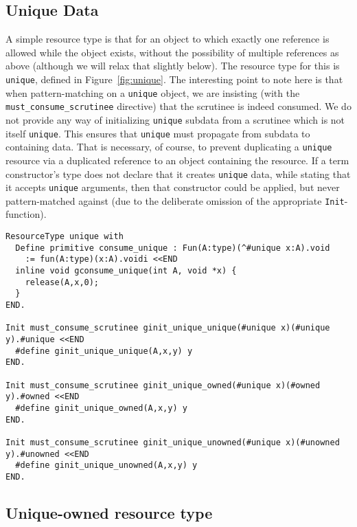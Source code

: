 \documentclass[9pt,natbib]{sigplanconf}
\begin{document}
\subsection{Unique Data}

A simple resource type is that for an object to which exactly one
reference is allowed while the object exists, without the possibility
of multiple references as above (although we will relax that slightly
below).  The resource type for this is \texttt{unique}, defined in
Figure~\ref{fig:unique}.  The interesting point to note here is that
when pattern-matching on a \texttt{unique} object, we are insisting
(with the \texttt{must\_consume\_scrutinee} directive) that the
scrutinee is indeed consumed.  We do not provide any way of
initializing \texttt{unique} subdata from a scrutinee which is not
itself \texttt{unique}.  This ensures that \texttt{unique} must
propagate from subdata to containing data.  That is necessary, of
course, to prevent duplicating a \texttt{unique} resource via a
duplicated reference to an object containing the resource.  If a term
constructor's type does not declare that it creates \texttt{unique}
data, while stating that it accepts \texttt{unique} arguments, then
that constructor could be applied, but never pattern-matched against
(due to the deliberate omission of the appropriate
\texttt{Init}-function).

\begin{figure*}
\small
\begin{verbatim}
ResourceType unique with
  Define primitive consume_unique : Fun(A:type)(^#unique x:A).void
    := fun(A:type)(x:A).voidi <<END
  inline void gconsume_unique(int A, void *x) {
    release(A,x,0);
  }
END.

Init must_consume_scrutinee ginit_unique_unique(#unique x)(#unique y).#unique <<END
  #define ginit_unique_unique(A,x,y) y
END.

Init must_consume_scrutinee ginit_unique_owned(#unique x)(#owned y).#owned <<END
  #define ginit_unique_owned(A,x,y) y
END.

Init must_consume_scrutinee ginit_unique_unowned(#unique x)(#unowned y).#unowned <<END
  #define ginit_unique_unowned(A,x,y) y
END.
\end{verbatim}
\caption{The \texttt{unique} resource type}
\label{fig:unique}
\end{figure*}

\subsection{Unique-owned resource type}
\end{document}
